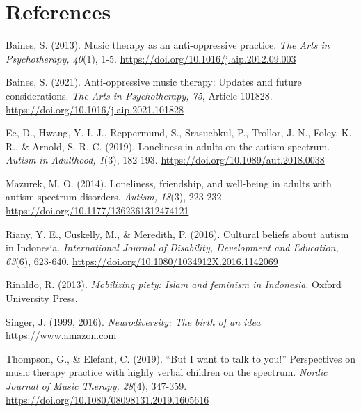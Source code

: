 \documentclass[authordate, empirical, issue]{jote-new-article}
\begin{document}
\newpage
\section{References}



\hspace*{\parindent}Baines, S. (2013). Music therapy as an anti-oppressive practice. \emph{The Arts in Psychotherapy, 40}(1), 1-5. \href{https://doi.org/10.1016/j.aip.2012.09.003}{https://doi.org/10.1016/j.aip.2012.09.003}







Baines, S. (2021). Anti-oppressive music therapy: Updates and future considerations. \emph{The Arts in Psychotherapy, 75}, Article 101828. \href{https://doi.org/10.1016/j.aip.2021.101828}{https://doi.org/10.1016/j.aip.2021.101828}







Ee, D., Hwang, Y. I. J., Reppermund, S., Srasuebkul, P., Trollor, J. N., Foley, K.-R., \& Arnold, S. R. C. (2019). Loneliness in adults on the autism spectrum. \emph{Autism in Adulthood, 1}(3), 182-193. \href{https://doi.org/10.1089/aut.2018.0038}{https://doi.org/10.1089/aut.2018.0038}







Mazurek, M. O. (2014). Loneliness, friendship, and well-being in adults with autism spectrum disorders. \emph{Autism, 18}(3), 223-232. \href{https://doi.org/10.1177/1362361312474121}{https://doi.org/10.1177/1362361312474121}







Riany, Y. E., Cuskelly, M., \& Meredith, P. (2016). Cultural beliefs about autism in Indonesia. \emph{International Journal of Disability, Development and Education, 63}(6), 623-640. \href{https://doi.org/10.1080/1034912X.2016.1142069}{https://doi.org/10.1080/1034912X.2016.1142069}







Rinaldo, R. (2013). \emph{Mobilizing piety: Islam and feminism in Indonesia}. Oxford University Press.







Singer, J. (1999, 2016). \emph{Neurodiversity: The birth of an idea} \href{https://www.amazon.com}{https://www.amazon.com}







Thompson, G., \& Elefant, C. (2019). “But I want to talk to you!” Perspectives on music therapy practice with highly verbal children on the spectrum. \emph{Nordic Journal of Music Therapy, 28}(4), 347-359. \href{https://doi.org/10.1080/08098131.2019.1605616}{https://doi.org/10.1080/08098131.2019.1605616}
\end{document}
